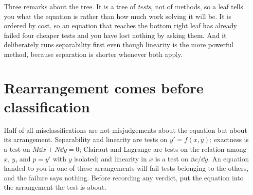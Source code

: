 \begin{center}
\end{center}

Three remarks about the tree. It is a tree of \emph{tests}, not of methods, so a leaf tells you what the equation is rather than how much work solving it will be. It is ordered by cost, so an equation that reaches the bottom right leaf has already failed four cheaper tests and you have lost nothing by asking them. And it deliberately runs separability first even though linearity is the more powerful method, because separation is shorter whenever both apply.

\section{Rearrangement comes before classification}

Half of all misclassifications are not misjudgements about the equation but about its arrangement. Separability and linearity are tests on $y'=f(x,y)$; exactness is a test on $M\dd x+N\dd y=0$; Clairaut and Lagrange are tests on the relation among $x$, $y$, and $p=y'$ with $y$ isolated; and linearity in $x$ is a test on $\dd x/\dd y$. An equation handed to you in one of these arrangements will fail tests belonging to the others, and the failure says nothing. Before recording any verdict, put the equation into the arrangement the test is about.

